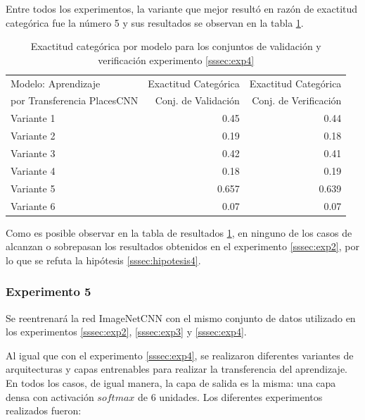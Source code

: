 Entre todos los experimentos, la variante que mejor resultó en razón de exactitud categórica fue la número 5 y sus resultados se observan en la tabla \ref{exp4:results}.


\begin{table}[h!]
	\centering
	\begin{tabular}{| l | r | r |}
		\toprule
		Modelo: Aprendizaje & Exactitud Categórica &  Exactitud Categórica \\
		por Transferencia PlacesCNN & Conj. de Validación &  Conj. de Verificación \\
		\midrule
		Variante 1 & 0.45 & 0.44 \\
		\midrule
		Variante 2 & 0.19 & 0.18 \\
		\midrule
		Variante 3 & 0.42 & 0.41 \\
		\midrule
		Variante 4 & 0.18 & 0.19 \\
		\midrule
		Variante 5 & 0.657 & 0.639 \\
		\midrule
		Variante 6 & 0.07 & 0.07 \\
		\bottomrule
	\end{tabular}
	\caption{Exactitud categórica por modelo para los conjuntos de validación y verificación experimento \ref{sssec:exp4}}
	\label{exp4:results}
\end{table}

Como es posible observar en la tabla de resultados \ref{exp4:results}, en ninguno de los casos de alcanzan o sobrepasan los resultados obtenidos en el experimento \ref{sssec:exp2}, por lo que se refuta la hipótesis \ref{sssec:hipotesis4}.

\subsubsection{Experimento 5} \label{sssec:exp5}
Se reentrenará la red ImageNetCNN con el mismo conjunto de datos utilizado en los experimentos \ref{sssec:exp2}, \ref{sssec:exp3} y \ref{sssec:exp4}.

Al igual que con el experimento \ref{sssec:exp4}, se realizaron diferentes variantes de arquitecturas y capas entrenables para realizar la transferencia del aprendizaje. En todos los casos, de igual manera, la capa de salida  es la misma: una capa densa con activación \(softmax\) de 6 unidades. Los diferentes experimentos realizados fueron:

